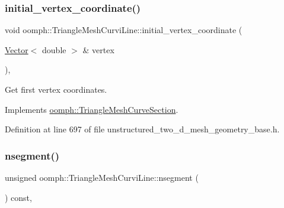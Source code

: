 \mbox{\label{classoomph_1_1TriangleMeshCurviLine_a164a96e8cce279bce6cb3f01f5bf6170}} 
\subsubsection{\texorpdfstring{initial\+\_\+vertex\+\_\+coordinate()}{initial\_vertex\_coordinate()}}
{\footnotesize\ttfamily void oomph\+::\+Triangle\+Mesh\+Curvi\+Line\+::initial\+\_\+vertex\+\_\+coordinate (\begin{DoxyParamCaption}\item[{\hyperlink{classoomph_1_1Vector}{Vector}$<$ double $>$ \&}]{vertex }\end{DoxyParamCaption})\hspace{0.3cm}{\ttfamily [inline]}, {\ttfamily [virtual]}}



Get first vertex coordinates. 



Implements \hyperlink{classoomph_1_1TriangleMeshCurveSection_a08c60883b595a52280c486badf8a4210}{oomph\+::\+Triangle\+Mesh\+Curve\+Section}.



Definition at line 697 of file unstructured\+\_\+two\+\_\+d\+\_\+mesh\+\_\+geometry\+\_\+base.\+h.

\mbox{\label{classoomph_1_1TriangleMeshCurviLine_af5ee48a8cb78c2c2954a14241b5b1489}} 
\subsubsection{\texorpdfstring{nsegment()}{nsegment()}\hspace{0.1cm}{\footnotesize\ttfamily [1/2]}}
{\footnotesize\ttfamily unsigned oomph\+::\+Triangle\+Mesh\+Curvi\+Line\+::nsegment (\begin{DoxyParamCaption}{ }\end{DoxyParamCaption}) const\hspace{0.3cm}{\ttfamily [inline]}, {\ttfamily [virtual]}}



